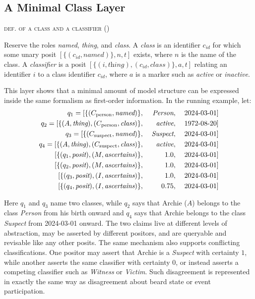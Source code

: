 \documentclass[a4paper,fleqn]{cas-sc}
\newcounter{majorcount}
\newcommand{\deffy}[3]{
	\vspace{2ex}
	\refstepcounter{majorcount}
	\noindent\textsc{#1} {\normalfont(\arabic{majorcount})}
	\\\begin{small}
	\noindent #2%
	\label{Def:#3}
	\end{small}
	\vspace{2ex}
}
\begin{document}
\subsection{A Minimal Class Layer}
\deffy{def. of a class and a classifier}{%
Reserve the roles \textit{named}, \textit{thing}, and \textit{class}. A \emph{class} is an identifier \(c_{id}\) for which some unary posit \([\{(c_{id}, \textit{named})\}, n, t]\) exists, where \(n\) is the name of the class. A \emph{classifier} is a posit \([\{(i,\textit{thing}), (c_{id},\textit{class})\}, a, t]\) relating an identifier \(i\) to a class identifier \(c_{id}\), where \(a\) is a marker such as \textit{active} or \textit{inactive}.}{class}

This layer shows that a minimal amount of model structure can be expressed inside the same formalism as first-order information. In the running example, let:
\begin{alignat*}{3}
q_{1} = [\{(C_{\mathrm{person}}, \textit{named})\},\;&& \textit{Person},\;&& \textrm{2024\text{-}03\text{-}01}] \\
q_{2} = [\{(A, \textit{thing}), (C_{\mathrm{person}}, \textit{class})\},\;&& \textit{active},\;&& \textrm{1972\text{-}08\text{-}20}] \\
q_{3} = [\{(C_{\mathrm{suspect}}, \textit{named})\},\;&& \textit{Suspect},\;&& \textrm{2024\text{-}03\text{-}01}] \\
q_{4} = [\{(A, \textit{thing}), (C_{\mathrm{suspect}}, \textit{class})\},\;&& \textit{active},\;&& \textrm{2024\text{-}03\text{-}01}] \\
[\{(q_{1}, \textit{posit}), (M, \textit{ascertains})\},\;&& 1.0,\;&& \textrm{2024\text{-}03\text{-}01}] \\
[\{(q_{2}, \textit{posit}), (M, \textit{ascertains})\},\;&& 1.0,\;&& \textrm{2024\text{-}03\text{-}01}] \\
[\{(q_{3}, \textit{posit}), (I, \textit{ascertains})\},\;&& 1.0,\;&& \textrm{2024\text{-}03\text{-}01}] \\
[\{(q_{4}, \textit{posit}), (I, \textit{ascertains})\},\;&& 0.75,\;&& \textrm{2024\text{-}03\text{-}01}]
\end{alignat*}

Here \(q_{1}\) and \(q_{3}\) name two classes, while \(q_{2}\) says that Archie (\(A\)) belongs to the class \textit{Person} from his birth onward and \(q_{4}\) says that Archie belongs to the class \textit{Suspect} from 2024-03-01 onward. The two claims live at different levels of abstraction, may be asserted by different positors, and are queryable and revisable like any other posits. The same mechanism also supports conflicting classifications. One positor may assert that Archie is a \textit{Suspect} with certainty \(1\), while another asserts the same classifier with certainty \(0\), or instead asserts a competing classifier such as \textit{Witness} or \textit{Victim}. Such disagreement is represented in exactly the same way as disagreement about beard state or event participation.
\end{document}
